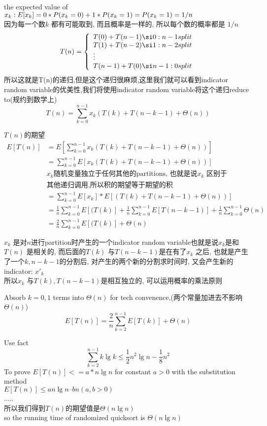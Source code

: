 \documentclass{article}
\begin{document}
the expected value of $x_k:\\
E[x_k]=0*P(x_k =0)+1*P(x_k =1) = P(x_k =1) =1/n$\\
因为每一个数$k$ 都有可能取到, 而且概率是一样的, 所以每个数的概率都是 $1/n$
$$
T(n) =
\left\{
  \begin{array}{ll}
		  T(0) + T(n-1) \si 0:n-1 split \\
		  T(1) + T(n-2) \si 1:n-2 split \\
            \vdots \\
		  T(n-1) + T(0) \si n-1:0 split
  \end{array}
\right.
$$
所以这就是T(n)的递归,但是这个递归很麻烦,这里我们就可以看到indicator random variable的优美性,我们将使用indicator random variable将这个递归reduce to(规约到数学上)
$$
T(n) = \sum_{k=0}^{n-1} x_k (T(k) + T(n-k-1) + \Theta(n))
$$

$T(n)$的期望
\begin{equation}
\begin{split}
   E[T(n)] & =E[\sum_{k=0}^{n-1}x_k(T(k)+T(n-k-1)+\Theta(n))] \\
           & =\sum_{k=0}^{n-1}E[x_k(T(k)+T(n-k-1)+\Theta(n))]\\
           & \text{$x_k$随机变量独立于任何其他的partitions, 也就是说$x_k$ 区别于}\\
           & \text{其他递归调用,所以积的期望等于期望的积}\\
           & =\sum_{k=0}^{n-1}E[x_k]*E[(T(k)+T(n-k-1)+\Theta(n))]\\
           & = \frac{1}{n}\sum_{k=0}^{n-1}E[(T(k)] + \frac{1}{n}\sum_{k=0}^{n-1}E[T(n-k-1)] +\frac{1}{n}\sum_{k=0}^{n-1}\Theta(n)\\
           & =\frac{2}{n}\sum_{k=0}^{n-1}E[(T(k)] +\Theta(n)
\end{split}
\end{equation}

$x_k$ 是对$n$进行partition时产生的一个indicator random variable也就是说$x_k$是和$T(n)$ 是相关的, 而后面的$T(k)$ 与$T(n-k-1)$是在有了$x_k$ 之后, 也就是产生了一个$k,n-k-1$的分割后, 对产生的两个新的分割求时间时, 又会产生新的indicator: $x'_k$\\
所以$x_k$ 与$T(k), T(n-k-1)$是相互独立的, 可以运用概率的乘法原则

Absorb $k=0,1$ terms into $\Theta(n)$ for tech convenence,(两个常量加进去不影响$\Theta(n)$)
$$
E[T(n)]=\frac{2}{n}\sum_{k=2}^{n-1}E[T(k)]+\Theta(n)
$$

Use fact
$$
\sum_{k=2}^{n-1}k\lg k \leq \frac{1}{2}n^2\lg n-\frac{1}{8}n^2
$$
To prove $E[T(n)]<=a*n\lg n$ for constant $a>0$ with the substitution method\\
$E[T(n)] \leq an \lg n –bn (a, b >0)$\\
.....\\
所以我们得到$T(n)$的期望值是$\Theta(n\lg n)$\\
so the running time of randomized quicksort is $\Theta(n\lg n)$
\end{document}
